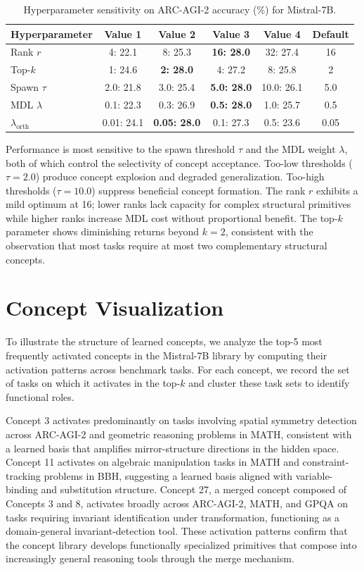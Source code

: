 \documentclass[11pt]{article}
\begin{document}
\begin{table}[h]
\centering
\caption{Hyperparameter sensitivity on ARC-AGI-2 accuracy (\%) for Mistral-7B.}
\label{tab:hyper}
\small
\begin{tabular}{lccccc}
\toprule
Hyperparameter & Value 1 & Value 2 & Value 3 & Value 4 & Default \\
\midrule
Rank $r$ & 4: 22.1 & 8: 25.3 & \textbf{16: 28.0} & 32: 27.4 & 16 \\
Top-$k$ & 1: 24.6 & \textbf{2: 28.0} & 4: 27.2 & 8: 25.8 & 2 \\
Spawn $\tau$ & 2.0: 21.8 & 3.0: 25.4 & \textbf{5.0: 28.0} & 10.0: 26.1 & 5.0 \\
MDL $\lambda$ & 0.1: 22.3 & 0.3: 26.9 & \textbf{0.5: 28.0} & 1.0: 25.7 & 0.5 \\
$\lambda_{\text{orth}}$ & 0.01: 24.1 & \textbf{0.05: 28.0} & 0.1: 27.3 & 0.5: 23.6 & 0.05 \\
\bottomrule
\end{tabular}
\end{table}

Performance is most sensitive to the spawn threshold $\tau$ and the MDL weight $\lambda$, both of which control the selectivity of concept acceptance. Too-low thresholds ($\tau = 2.0$) produce concept explosion and degraded generalization. Too-high thresholds ($\tau = 10.0$) suppress beneficial concept formation. The rank $r$ exhibits a mild optimum at 16; lower ranks lack capacity for complex structural primitives while higher ranks increase MDL cost without proportional benefit. The top-$k$ parameter shows diminishing returns beyond $k = 2$, consistent with the observation that most tasks require at most two complementary structural concepts.

\section{Concept Visualization}

To illustrate the structure of learned concepts, we analyze the top-5 most frequently activated concepts in the Mistral-7B library by computing their activation patterns across benchmark tasks. For each concept, we record the set of tasks on which it activates in the top-$k$ and cluster these task sets to identify functional roles.

Concept 3 activates predominantly on tasks involving spatial symmetry detection across ARC-AGI-2 and geometric reasoning problems in MATH, consistent with a learned basis that amplifies mirror-structure directions in the hidden space. Concept 11 activates on algebraic manipulation tasks in MATH and constraint-tracking problems in BBH, suggesting a learned basis aligned with variable-binding and substitution structure. Concept 27, a merged concept composed of Concepts 3 and 8, activates broadly across ARC-AGI-2, MATH, and GPQA on tasks requiring invariant identification under transformation, functioning as a domain-general invariant-detection tool. These activation patterns confirm that the concept library develops functionally specialized primitives that compose into increasingly general reasoning tools through the merge mechanism.
\end{document}
